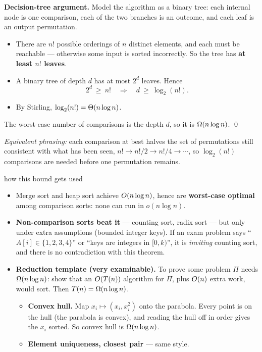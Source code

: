 \begin{correct}
\textbf{Decision-tree argument.} Model the algorithm as a binary tree: each internal node is one
comparison, each of the two branches is an outcome, and each leaf is an output permutation.
\begin{itemize}
  \item There are $n!$ possible orderings of $n$ distinct elements, and each must be reachable
        --- otherwise some input is sorted incorrectly. So the tree has \textbf{at least $n!$
        leaves}.
  \item A binary tree of depth $d$ has at most $2^d$ leaves. Hence
        \[
          2^d\ \ge\ n!\quad\Longrightarrow\quad d\ \ge\ \log_2(n!) .
        \]
  \item By Stirling, $\log_2(n!)=\Theta(n\log n)$.
\end{itemize}
The worst-case number of comparisons is the depth $d$, so it is $\Omega(n\log n)$. \qed

\emph{Equivalent phrasing:} each comparison at best halves the set of permutations still
consistent with what has been seen, $n!\to n!/2\to n!/4\to\cdots$, so $\log_2(n!)$ comparisons
are needed before one permutation remains.
\end{correct}

\begin{facts}{how this bound gets used}
\begin{itemize}
  \item Merge sort and heap sort achieve $O(n\log n)$, hence are \textbf{worst-case optimal}
        among comparison sorts: none can run in $o(n\log n)$.
  \item \textbf{Non-comparison sorts beat it} --- counting sort, radix sort --- but only under
        extra assumptions (bounded integer keys). If an exam problem says
        ``$A[i]\in\{1,2,3,4\}$'' or ``keys are integers in $[0,k)$'', it is \emph{inviting}
        counting sort, and there is no contradiction with this theorem.
  \item \textbf{Reduction template (very examinable).} To prove some problem $\Pi$ needs
        $\Omega(n\log n)$: show that an $O(T(n))$ algorithm for $\Pi$, plus $O(n)$ extra work,
        would sort. Then $T(n)=\Omega(n\log n)$.
        \begin{itemize}
          \item \textbf{Convex hull.} Map $x_i\mapsto(x_i,x_i^2)$ onto the parabola. Every point
                is on the hull (the parabola is convex), and reading the hull off in order gives
                the $x_i$ sorted. So convex hull is $\Omega(n\log n)$.
          \item \textbf{Element uniqueness, closest pair} --- same style.
        \end{itemize}
\end{itemize}
\end{facts}

